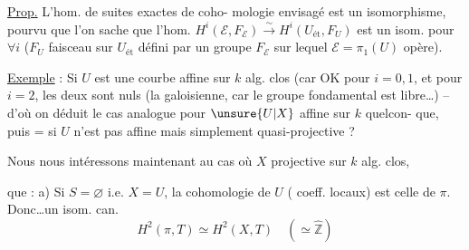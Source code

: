 \uline{Prop.} L'hom. de suites exactes de coho-
mologie envisagé est un isomorphisme,
pourvu que l'on sache que l'hom.
$H^i(\mathcal E,F_{\mathcal E})\xrightarrow{\sim}H^i(U_{\mathrm{ét}},F_U)$ est un isom.
pour $\forall i$ ($F_U$ faisceau  sur $U_{\mathrm{ét}}$
défini par un groupe $F_{\mathcal E}$ sur lequel $\mathcal E=\pi_1(U)$
opère).

\uline{Exemple} : Si $U$ est une courbe affine
sur $k$ alg. clos  (car OK pour $i=0,1$, et
pour $i=2$, les deux  sont nuls
(la  galoisienne, car le groupe fondamental
 est  libre\ldots) -- d'où on déduit le
cas analogue pour $\unsure{U|X}$ affine sur $k$ quelcon-
que, puis = si $U$ n'est pas affine mais
simplement quasi-projective ? 

Nous nous intéressons maintenant au
cas où $X$ projective  sur $k$ alg. clos, 

que : 
a) Si $S=\varnothing$ i.e. $X=U$, la cohomologie de $U$
 ( coeff. locaux) est celle
de $\pi$. Donc\ldots un isom. can.
\[
H^2(\pi,T)\simeq H^2(X,T)\quad(\simeq\widehat{\mathbb Z})
\]

